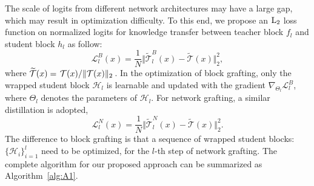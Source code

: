 \documentclass[letterpaper]{article} %
\begin{document}
{{        The scale of logits from different network architectures may have a large gap, which may result in optimization difficulty. 
        To this end, we propose an $\rm{L}_2$ loss function on normalized logits for knowledge transfer between teacher block $f_l$ and student block $h_l$ as follow:
        \begin{equation} \label{eq:loss_block_graft}
            \mathcal{L}_l^{B}(x) = \frac{1}{N} \Vert \widetilde{\mathcal{T}}_l^B(x) - \widetilde{\mathcal{T}}(x) \Vert_2^2,
        \end{equation}
        where $\widetilde{\mathcal{T}}(x) = \left.{\mathcal{T}(x)}\middle/{\Vert \mathcal{T}(x) \Vert_2}\right.$.
        In the optimization of block grafting, only the wrapped student block $\mathcal{H}_l$ is learnable and updated with the gradient $\nabla_{\Theta_l} \mathcal{L}_l^{B}$, where $\Theta_l$ denotes the parameters of $\mathcal{H}_l$.
        For network grafting, a similar distillation is adopted,
        \begin{equation} \label{eq:loss_net_graft}
            \mathcal{L}_l^{N}(x) = \frac{1}{N} \Vert \widetilde{\mathcal{T}}_l^N(x) - \widetilde{\mathcal{T}}(x) \Vert_2^2.
        \end{equation}
        The difference to block grafting is that a sequence of wrapped student blocks: $\{ \mathcal{H}_i \}_{i=1}^l$ need to be optimized, for the $l$-th step of network grafting.
        The complete algorithm for our proposed approach can be summarized as Algorithm~\ref{alg:A1}.
        
    }
}
\end{document}
